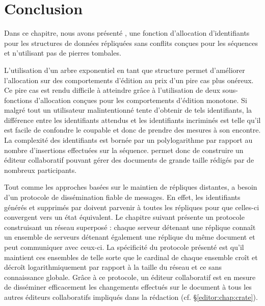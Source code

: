 
\section{Conclusion}
\label{repl:sec:conclusion}

Dans ce chapitre, nous avons présenté \LSEQ, une fonction d'allocation
d'identifiants pour les structures de données répliquées sans conflits conçues
pour les séquences et n'utilisant pas de pierres tombales.

L'utilisation d'un arbre exponentiel en tant que structure permet d'améliorer
l'allocation sur des comportements d'édition au prix d'un pire cas plus
onéreux. Ce pire cas est rendu difficile à atteindre grâce à l'utilisation de
deux sous-fonctions d'allocation conçues pour les comportements d'édition
monotone. Si malgré tout un utilisateur malintentionné tente d'obtenir de tels
identifiants, la différence entre les identifiants attendus et les identifiants
incriminés est telle qu'il est facile de confondre le coupable et donc de
prendre des mesures à son encontre. La complexité des identifiants \LSEQ est
bornée par un polylogarithme par rapport au nombre d'insertions effectuées
sur la séquence. \LSEQ permet donc de construire un éditeur collaboratif pouvant
gérer des documents de grande taille rédigés par de nombreux participants.

Tout comme les approches basées sur le maintien de répliques distantes, \LSEQ a
besoin d'un protocole de dissémination fiable de messages. En effet, les
identifiants générés et supprimés par \LSEQ doivent parvenir à toutes les
répliques pour que celles-ci convergent vers un état équivalent.  Le chapitre
suivant présente un protocole construisant un réseau superposé : chaque serveur
détenant une réplique connaît un ensemble de serveurs détenant également une
réplique du même document et peut communiquer avec ceux-ci. La spécificité du
protocole présenté est qu'il maintient ces ensembles de telle sorte que le
cardinal de chaque ensemble croît et décroît logarithmiquement par rapport à la
taille du réseau et ce sans connaissance globale. Grâce à ce protocole, un
éditeur collaboratif est en mesure de disséminer efficacement les changements
effectués sur le document à tous les autres éditeurs collaboratifs impliqués
dans la rédaction (cf. §\ref{editor:chap:crate}).


